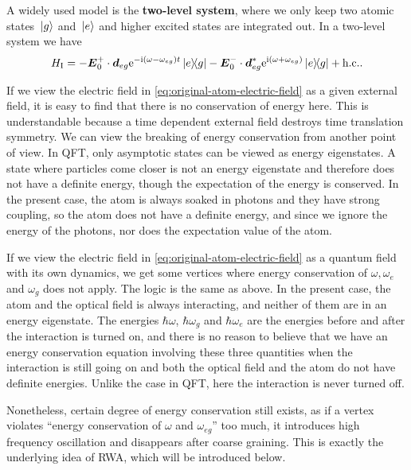 \documentclass[hyperref, a4paper]{article}
\newcommand*{\ii}{\mathrm{i}}
\newcommand*{\ee}{\mathrm{e}}
\newcommand*{\concept}[1]{{\textbf{#1}}}
\begin{document}
A widely used model is the \concept{two-level system}, where we only keep two atomic states $\ket*{g}$ and $\ket*{e}$ and higher excited states are integrated out.
In a two-level system we have 
\begin{equation}
    H_\text{I} = - \vb*{E}_0^+ \cdot \vb*{d}_{eg} \ee^{- \ii (\omega - \omega_{eg}) t} \dyad{e}{g} - \vb*{E}_0^- \cdot \vb*{d}^*_{{eg}} \ee^{\ii (\omega + \omega_{eg})} \dyad{e}{g} + \text{h.c.}.
    \label{eq:original-atom-electric-field}
\end{equation}
\begin{note*}{}
    If we view the electric field in \eqref{eq:original-atom-electric-field} as a given external field,
    it is easy to find that there is no conservation of energy here. This is understandable because 
    a time dependent external field destroys time translation symmetry. We can view the breaking of 
    energy conservation from another point of view. In QFT, only asymptotic states can be viewed as 
    energy eigenstates. A state where particles come closer is not an energy eigenstate and therefore 
    does not have a definite energy, though the expectation of the energy is conserved.
    In the present case, the atom is always soaked in photons and they have strong coupling, so the 
    atom does not have a definite energy, and since we ignore the energy of the photons, nor does 
    the expectation value of the atom.

    If we view the electric field in \eqref{eq:original-atom-electric-field} as a quantum field with its own dynamics,
    we get some vertices where energy conservation of $\omega, \omega_e$ and $\omega_g$ does not apply. The logic is the same as above.
    In the present case, the atom and the optical field is always interacting, and neither of them 
    are in an energy eigenstate. The energies $\hbar \omega$, $\hbar \omega_g$ and $\hbar \omega_e$
    are the energies before and after the interaction is turned on, and there is no reason to believe that we have an energy conservation equation involving these three quantities when the interaction is still going on and both the optical field and the atom do not have definite energies. Unlike the case in QFT, here 
    the interaction is never turned off. 

    Nonetheless, certain degree of energy conservation still exists, as if a vertex violates ``energy 
    conservation of $\omega$ and $\omega_{eg}$'' too much, it introduces high frequency oscillation 
    and disappears after coarse graining. This is exactly the underlying idea of RWA, which will be 
    introduced below.
\end{note*}
\end{document}
